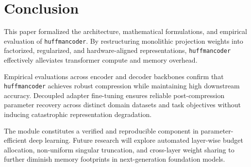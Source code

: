 \section{Conclusion}
This paper formalized the architecture, mathematical formulations, and empirical evaluation of \texttt{huffmancoder}. By restructuring monolithic projection weights into factorized, regularized, and hardware-aligned representations, \texttt{huffmancoder} effectively alleviates transformer compute and memory overhead.

Empirical evaluations across encoder and decoder backbones confirm that \texttt{huffmancoder} achieves robust compression while maintaining high downstream accuracy. Decoupled adapter fine-tuning ensures reliable post-compression parameter recovery across distinct domain datasets and task objectives without inducing catastrophic representation degradation.

The module constitutes a verified and reproducible component in parameter-efficient deep learning. Future research will explore automated layer-wise budget allocation, non-uniform singular truncation, and cross-layer weight sharing to further diminish memory footprints in next-generation foundation models.
